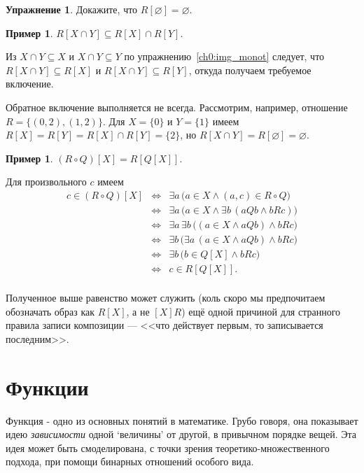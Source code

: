 \documentclass[12pt,notitlepage]{article}
\theoremstyle{plain}
\theoremstyle{definition}
\newtheorem{exc}[thm]{Упражнение}
\newtheorem{exm}[thm]{Пример}
\theoremstyle{plain}
\newcommand{\sbs}{\subseteq}
\newcommand{\void}{\varnothing}
\newcommand{\1}{\mathbf{1}}
\newcommand{\0}{\mathbf{0}}
\begin{document}
\begin{exc}
	Докажите, что $R[\void] = \void$.
\end{exc}

\begin{exm}\label{ch0:exm25}
	$R[X \cap Y] \sbs R[X] \cap R[Y]$.
	
	Из $X \cap Y \sbs X$ и $X \cap Y \sbs Y$ по упражнению~\ref{ch0:img_monot} следует, что $R[X \cap Y] \sbs R[X]$ и $R[X \cap Y] \sbs R[Y]$, откуда получаем требуемое включение.
	
	Обратное включение выполняется не всегда. Рассмотрим, например, отношение $R = \{(0,2), (1,2)\}$. Для $X = \{0\}$ и $Y = \{1\}$ имеем $R[X] = R[Y] = R[X] \cap R[Y]  = \{2\}$, но $R[X \cap Y] = R[\void] = \void$.
\end{exm}

\begin{exm}
	$(R \circ Q)[X] = R[Q[X]]$.
	
	Для произвольного $c$ имеем
	$$
	\begin{array}{rcl}
		c \in (R \circ Q)[X] &\iff& \exists a\, \bigl( a \in X \wedge (a,c) \in R \circ Q \bigr)\\
		&\iff& \exists a\, \bigl( a \in X \wedge \exists b\, ( a Q b \wedge b R c) \bigr)\\
		&\iff& \exists a\, \exists b\,\bigl( (a \in X \wedge a Q b) \wedge b R c \bigr)\\
		&\iff& \exists b\, \bigl( \exists a\, (a \in X \wedge a Q b) \wedge b R c \bigr)\\
		&\iff& \exists b\, \bigl( b \in Q[X] \wedge b R c \bigr)\\
		&\iff& c \in R[Q[X]].\\
	\end{array}
	$$
\end{exm}
Полученное выше равенство может служить (коль скоро мы предпочитаем обозначать образ как $R[X]$, а не $[X]R$) ещё одной причиной для странного правила записи композиции --- <<что действует первым, то записывается последним>>.

\section{Функции}
Функция - одно из основных понятий в математике. Грубо говоря, она показывает идею \emph{зависимости} одной `величины' от другой, в привычном порядке вещей. Эта идея может быть смоделирована, с точки зрения теоретико-множественного подхода, при помощи бинарных отношений особого вида.
\end{document}
